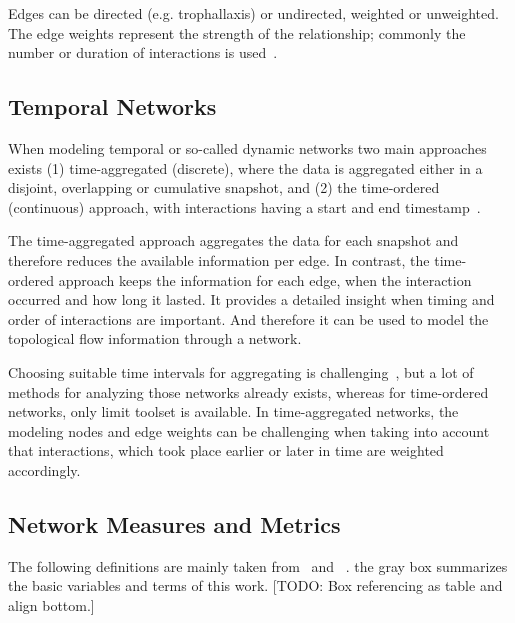 Edges can be directed (e.g. trophallaxis) or undirected, weighted or unweighted. The edge weights represent the strength of the relationship; commonly the number or duration of interactions is used~\cite{farine2015constructing}.

\subsection{Temporal Networks}
When modeling temporal or so-called dynamic networks two main approaches exists (1) time-aggregated (discrete), where the data is aggregated either in a disjoint, overlapping or cumulative snapshot, and (2) the time-ordered (continuous) approach, with interactions having a start and end timestamp~\cite{moody2005dynamic, Pinter-Wollman2014, blonder2012temporal}.

The time-aggregated approach aggregates the data for each snapshot and therefore reduces the available information per edge. In contrast, the time-ordered approach keeps the information for each edge, when the interaction occurred and how long it lasted. It provides a detailed insight when timing and order of interactions are important.  And therefore it can be used to model the topological flow information through a network.

Choosing suitable time intervals for aggregating is challenging~\cite{Pinter-Wollman2014}, but a lot of methods for analyzing those networks already exists, whereas for time-ordered networks, only limit toolset is available. In time-aggregated networks, the modeling nodes and edge weights can be challenging when taking into account that interactions, which took place earlier or later in time are weighted accordingly.

\subsection{Network Measures and Metrics}
\label{sec:definitions}
The following definitions are mainly taken from~\textcite{barabasi2016network} and ~\textcite{newman2010networks}. the gray box summarizes the basic variables and terms of this work. [TODO: Box referencing as table and align bottom.]

